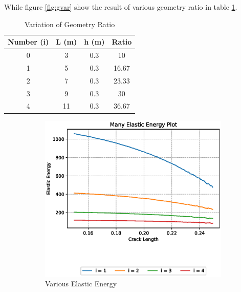 \documentclass[a4paper,11pt]{article}
\begin{document}
\newpage
While figure \ref{fig:gvar} show the result of various geometry ratio in table \ref{tab:gvar}.
\begin{table}[h!]
	\centering
	\begin{tabular}{|c|c|c|c|}
		\hline
		Number (i)	&	L (m)	&	h (m)	&	Ratio	\\
		\hline
0	&	3	&	0.3	&	10	\\
1	&	5	&	0.3	&	16.67	\\
2	&	7	&	0.3	&	23.33	\\
3	&	9	&	0.3	&	30	\\
4	&	11	&	0.3	&	36.67	\\
		\hline
	\end{tabular}
	\caption{Variation of Geometry Ratio}
	\label{tab:gvar}
\end{table}
\begin{figure}[h!]
	\begin{subfigure}[b]{0.49\linewidth}
		\centering
		\includegraphics[width=\linewidth]{picture/conference/manyelastic-gvar}
		\caption{Various Elastic Energy}
		\label{fig:manyelastic-gvar}
	\end{subfigure}
	\begin{subfigure}[b]{0.49\linewidth}
		\centering

\end{subfigure}
\end{figure}
\end{document}
